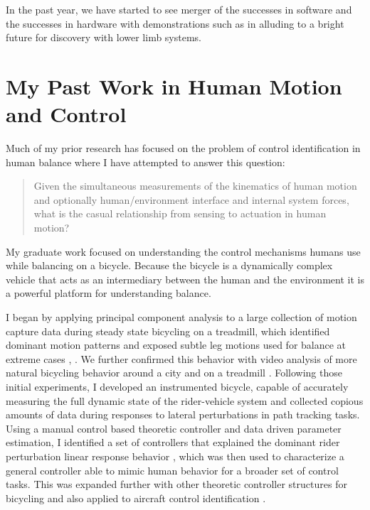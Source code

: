 \documentclass[letter]{article}
\begin{document}
In the past year, we have started to see merger of the successes in software
and the successes in hardware with demonstrations such as in \cite{OpenAI2018}
alluding to a bright future for discovery with lower limb systems.



\section{My Past Work in Human Motion and Control%
  \label{my-past-work-in-human-motion-and-control}%
}

Much of my prior research has focused on the problem of control identification
in human balance where I have attempted to answer this question:

\begin{quote}
Given the simultaneous measurements of the kinematics of human motion and
optionally human/environment interface and internal system forces, what is
the casual relationship from sensing to actuation in human motion?
\end{quote}

My graduate work focused on understanding the control mechanisms humans use
while balancing on a bicycle. Because the bicycle is a dynamically complex
vehicle \cite{Astrom2005,Meijaard2007,Moore2007,Moore2008} that acts as an
intermediary between the human and the environment it is a powerful platform
for understanding balance.

I began by applying principal component analysis to a large collection of
motion capture data during steady state bicycling on a treadmill, which
identified dominant motion patterns and exposed subtle leg motions used for
balance at extreme cases \cite{Moore2009a}, \cite{Moore2011c}. We further confirmed
this behavior with video analysis of more natural bicycling behavior around a
city and on a treadmill \cite{Kooijman2009}. Following those initial experiments, I
developed an instrumented bicycle, capable of accurately measuring the full
dynamic state of the rider-vehicle system \cite{Moore2012,Moore2013} and
collected copious amounts of data during responses to lateral perturbations in
path tracking tasks. Using a manual control based theoretic controller
\cite{Hess2012} and data driven parameter estimation, I identified a set of
controllers that explained the dominant rider perturbation linear response
behavior \cite{Moore2012}, which was then used to characterize a general controller
able to mimic human behavior for a broader set of control tasks. This was
expanded further with other theoretic controller structures for bicycling
\cite{Schwab2012a,Schwab2012,Schwab2013} and also applied to aircraft control
identification \cite{Hess2013}.
\end{document}
